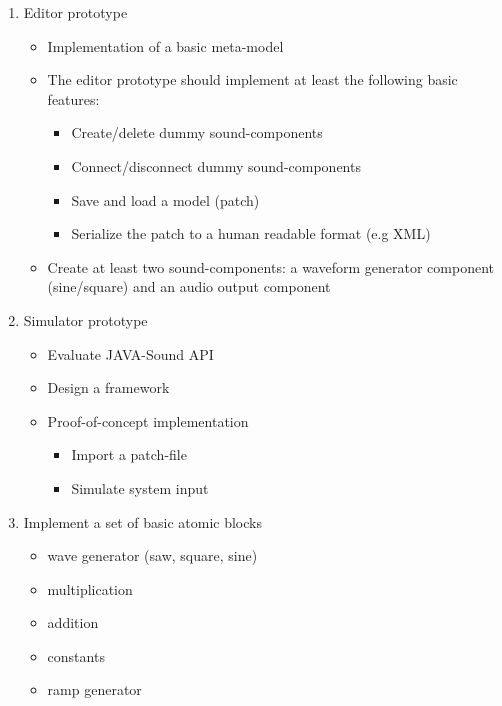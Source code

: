 \begin{enumerate}
	\item Editor prototype
		\begin{itemize}
			\item Implementation of a basic meta-model
			\item The editor prototype should implement at least the following basic features:
				\begin{itemize}
					\item Create/delete dummy sound-components
					\item Connect/disconnect dummy sound-components
					\item Save and load a model (patch)
					\item Serialize the patch to a human readable format (e.g \ac{XML})
				\end{itemize}
			\item Create at least two sound-components: a waveform generator component (sine/square) and an audio output component
		\end{itemize}
	\item Simulator prototype
		\begin{itemize}
			\item Evaluate JAVA-Sound API
			\item Design a framework
			\item Proof-of-concept implementation
			\begin{itemize}
				\item Import a patch-file
				\item Simulate system input
			\end{itemize}
		\end{itemize}
	\item Implement a set of basic atomic blocks %
		\begin{itemize}
			\item wave generator (saw, square, sine)
			\item multiplication
			\item addition
			\item constants
			\item ramp generator
		\end{itemize}
\end{enumerate}


